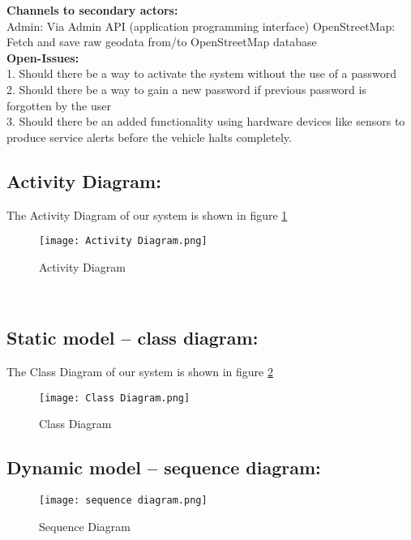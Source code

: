 \documentclass[11pt]{article} %
\begin{document}
\begin{enumerate}
	\textbf{Channels to secondary actors:} \\
	Admin: Via Admin API (application programming interface)
	OpenStreetMap: Fetch and save raw geodata from/to OpenStreetMap database\\
	\textbf{Open-Issues:}\\
	1. Should there be a way to activate the system without the use of a password\\
	2. Should there be a way to gain a new password if previous password is forgotten by the user\\
	3. Should there be an added functionality using hardware devices like sensors to produce service alerts before the vehicle halts completely.
	\end{enumerate}
	
	\subsection{Activity Diagram:}
	The Activity Diagram of our system is shown in figure \ref{fig:Activity Diagram}
	
	\begin{figure}[!hbt]
		 \centering
        \texttt{[image: Activity Diagram.png]} \par 
        \caption{Activity Diagram}
        \label{fig:Activity Diagram}
        \end{figure}
	
	\\
	\subsection{Static model – class diagram:}
	The Class Diagram of our system is shown in figure \ref{fig:Class Diagram}
	
	
	\begin{figure}[!hbt]
		 \centering
        \texttt{[image: Class Diagram.png]} \par 
        \caption{Class Diagram}
        \label{fig:Class Diagram}
        \end{figure}
	
	\subsection{Dynamic model – sequence diagram:}
	
		
	\begin{figure}[!hbt]
		 \centering
        \texttt{[image: sequence diagram.png]} \par 
        \caption{Sequence Diagram}
        \label{fig:Sequence Diagram}
        \end{figure}
	
\end{document}

